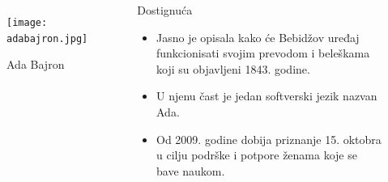 \documentclass[aspectratio=169]{beamer}
\begin{document}
\begin{frame}
    \begin{columns}
        \begin{figure}[h]
    \centering
    \texttt{[image: adabajron.jpg]}
    \caption{Ada Bajron}
    \label{fig:my_label}
\end{figure}

        \begin{block}{Dostignuća}
            \begin{itemize}
                \item<1-> Jasno je opisala kako će Bebidžov uređaj funkcionisati svojim prevodom i beleškama koji su objavljeni 1843. godine.

                \item<2-> U njenu čast je jedan softverski jezik nazvan Ada.

                \item<3-> Od 2009. godine dobija priznanje 15. oktobra u cilju podrške i potpore ženama koje se bave naukom.
                
            \end{itemize}
        \end{block}        
    \end{columns}
   
\end{frame}
    

\end{document}
